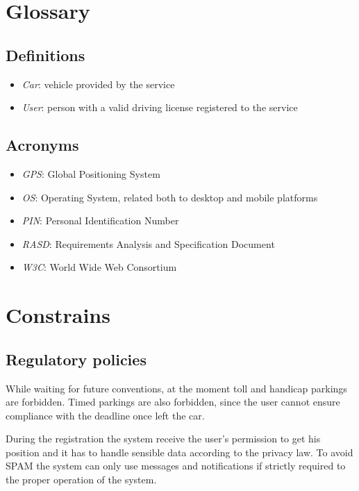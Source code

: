 \section{Glossary}

\subsection{Definitions}
\begin{itemize}
	\item \emph{Car}: vehicle provided by the service 
	\item \emph{User}: person with a valid driving license registered to the service
\end{itemize}

\subsection{Acronyms}
\begin{itemize}
	\item \emph{GPS}: Global Positioning System
	\item \emph{OS}: Operating System, related both to desktop and mobile platforms
	\item \emph{PIN}: Personal Identification Number
	\item \emph{RASD}: Requirements Analysis and Specification Document
	\item \emph{W3C}: World Wide Web Consortium
\end{itemize}

\section{Constrains}

\subsection{Regulatory policies}
While waiting for future conventions, at the moment toll and handicap parkings are forbidden. Timed parkings are also forbidden, since the user cannot ensure compliance with the deadline once left the car.

During the registration the system receive the user's permission to get his position and it has to handle sensible data according to the privacy law. To avoid SPAM the system can only use messages and notifications if strictly required to the proper operation of the system.

